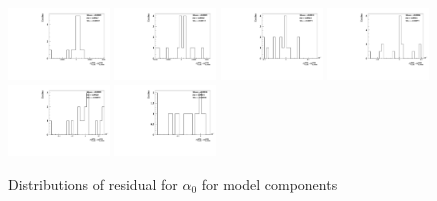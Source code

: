 \begin{figure}[h]
    \includegraphics[width=0.24\textwidth]{figure/polarimetery/syst/model/output_model_4740_alpha0.pdf}
    \includegraphics[width=0.24\textwidth]{figure/polarimetery/syst/model/output_model_4750_alpha0.pdf}
    \includegraphics[width=0.24\textwidth]{figure/polarimetery/syst/model/output_model_4780_alpha0.pdf}
    \includegraphics[width=0.24\textwidth]{figure/polarimetery/syst/model/output_model_4840_alpha0.pdf}
    \includegraphics[width=0.24\textwidth]{figure/polarimetery/syst/model/output_model_4920_alpha0.pdf}
    \includegraphics[width=0.24\textwidth]{figure/polarimetery/syst/model/output_model_4950_alpha0.pdf}
    \caption{Distributions of residual for $\alpha_0$ for model components}
\label{fig:angular_model_alpha0}
\end{figure}

